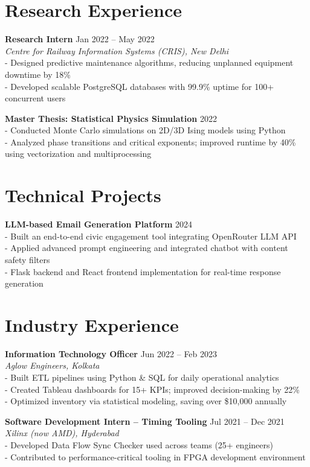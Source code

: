 \documentclass[a4paper,10pt]{article}
\begin{document}
\section*{Research Experience}
\textbf{Research Intern} \hfill Jan 2022 -- May 2022 \\
\textit{Centre for Railway Information Systems (CRIS), New Delhi} \\
- Designed predictive maintenance algorithms, reducing unplanned equipment downtime by 18\% \\
- Developed scalable PostgreSQL databases with 99.9\% uptime for 100+ concurrent users

\textbf{Master Thesis: Statistical Physics Simulation} \hfill 2022 \\
- Conducted Monte Carlo simulations on 2D/3D Ising models using Python \\
- Analyzed phase transitions and critical exponents; improved runtime by 40\% using vectorization and multiprocessing

\section*{Technical Projects}
\textbf{LLM-based Email Generation Platform} \hfill 2024 \\
- Built an end-to-end civic engagement tool integrating OpenRouter LLM API \\
- Applied advanced prompt engineering and integrated chatbot with content safety filters \\
- Flask backend and React frontend implementation for real-time response generation

\section*{Industry Experience}
\textbf{Information Technology Officer} \hfill Jun 2022 -- Feb 2023 \\
\textit{Aglow Engineers, Kolkata} \\
- Built ETL pipelines using Python \& SQL for daily operational analytics \\
- Created Tableau dashboards for 15+ KPIs; improved decision-making by 22\% \\
- Optimized inventory via statistical modeling, saving over \$10,000 annually

\textbf{Software Development Intern – Timing Tooling} \hfill Jul 2021 -- Dec 2021 \\
\textit{Xilinx (now AMD), Hyderabad} \\
- Developed Data Flow Sync Checker used across teams (25+ engineers) \\
- Contributed to performance-critical tooling in FPGA development environment
\end{document}
